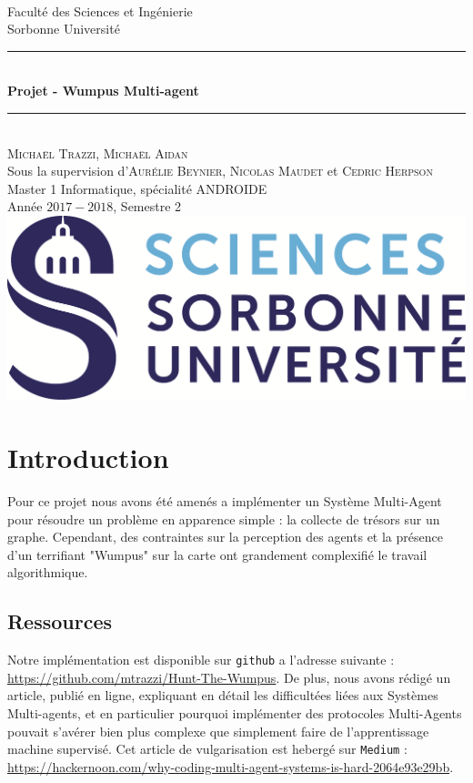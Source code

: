 \documentclass[a4paper, 10pt]{article}
\newcommand{\HRule}{\rule{\linewidth}{0.5mm}}
\begin{document}
\begin{titlepage}
\begin{center}
~\\[1cm]
\Large Faculté des Sciences et Ingénierie\\Sorbonne Université\\[3.5cm]
\HRule 
\\[0.4cm]{\huge \bfseries Projet - Wumpus Multi-agent\\[0.4cm]}
\HRule \\[1cm] 
\Large \textsc{Michaël Trazzi, Michaël Aidan} \\[0.1cm]
\normalsize Sous la supervision d'\textsc{Aurélie Beynier, Nicolas Maudet} et \textsc{Cedric Herpson}\\[2cm]
\Large Master 1 Informatique, spécialité ANDROIDE\\Année $2017-2018$, Semestre 2 \\[4cm]
\includegraphics[scale=0.3]{logo.png}
\end{center}
\end{titlepage}

\tableofcontents

\newpage
\section{Introduction}

Pour ce projet nous avons été amenés a implémenter un Système Multi-Agent pour résoudre un problème en apparence simple : la collecte de trésors sur un graphe. Cependant, des contraintes sur la perception des agents et la présence d'un terrifiant "Wumpus" sur la carte ont grandement complexifié le travail algorithmique.

\subsection{Ressources}

Notre implémentation est disponible sur \verb|github| a l'adresse suivante : \url{https://github.com/mtrazzi/Hunt-The-Wumpus}. De plus, nous avons rédigé un article, publié en ligne, expliquant en détail les difficultées liées aux Systèmes Multi-agents, et en particulier pourquoi implémenter des protocoles Multi-Agents pouvait s'avérer bien plus complexe que simplement faire de l'apprentissage machine supervisé. Cet article de vulgarisation est hebergé sur \verb|Medium| : \url{https://hackernoon.com/why-coding-multi-agent-systems-is-hard-2064e93e29bb}.
\end{document}
